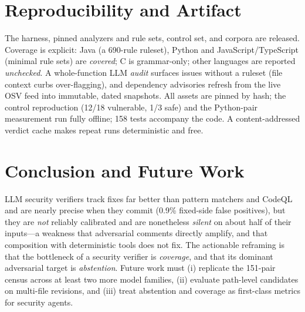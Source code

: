 \documentclass[conference]{IEEEtran}
\begin{document}
\section{Reproducibility and Artifact}
The harness, pinned analyzers and rule sets, control set, and corpora are released.
Coverage is explicit: Java (a 690-rule ruleset), Python and JavaScript/TypeScript
(minimal rule sets) are \emph{covered}; C is grammar-only; other languages are
reported \emph{unchecked}. A whole-function LLM \emph{audit} surfaces issues without
a ruleset (file context curbs over-flagging), and dependency advisories refresh from
the live OSV feed into immutable, dated snapshots. All assets are pinned by hash; the
control reproduction (12/18 vulnerable, 1/3 safe) and the Python-pair measurement run
fully offline; 158 tests accompany the code. A content-addressed verdict cache makes
repeat runs deterministic and free.

\section{Conclusion and Future Work}
LLM security verifiers track fixes far better than pattern matchers and CodeQL
and are nearly precise when they commit (0.9\% fixed-side false positives), but
they are \emph{not} reliably calibrated and are nonetheless \emph{silent} on
about half of their inputs---a
weakness that adversarial comments directly amplify, and that composition with
deterministic tools does not fix. The actionable reframing is that the bottleneck of
a security verifier is \emph{coverage}, and that its dominant adversarial target is
\emph{abstention}. Future work must (i) replicate the 151-pair census across at
least two more model families, (ii)
evaluate path-level candidates on multi-file revisions, and (iii) treat abstention
and coverage as first-class metrics for security agents.



\end{document}
